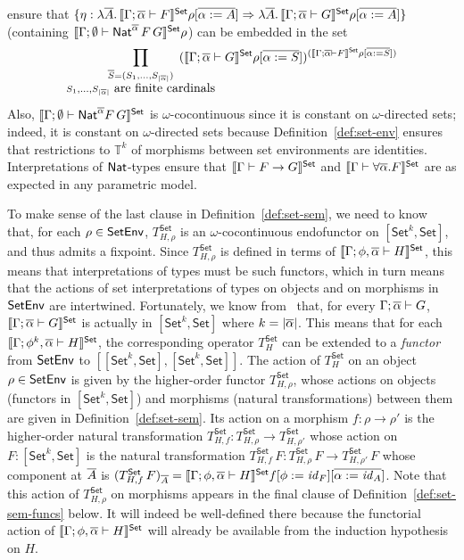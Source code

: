 \documentclass{lmcs}
\theoremstyle{plain}\newtheorem{satz}[thm]{Satz}
\newcommand{\set}{\mathsf{Set}}
\renewcommand{\id}{\mathit{id}}
\begin{document}
{ensure that $\{\eta : \lambda \ol{A}.\,\setsem{\Gamma;\ol{\alpha}
  \vdash F}\rho[\ol{\alpha := A}] \Rightarrow \lambda
\ol{A}.\,\setsem{\Gamma;\ol{\alpha} \vdash G}\rho[\ol{\alpha := A}]\}$
(containing $\setsem{\Gamma;\emptyset \vdash
  \Nat^{\ol{\alpha}}\,F\,G}\rho$) can be embedded in the set
\[ \prod_{\substack{\ol{S} =
    (S_1,...,S_{|\ol{\alpha}|})\\ S_1,...,S_{|\ol{\alpha}|} \mbox{ are
      finite cardinals}}} \hspace*{-0.4in}(\setsem{\Gamma;\ol{\alpha}
  \vdash G}\rho[\ol{\alpha := S}])^{(\setsem{\Gamma;\ol{\alpha} \vdash
    F}\rho[\ol{\alpha := S}])}\] Also, $\setsem{\Gamma; \emptyset
  \vdash \Nat^{\ol\alpha} F\,G}$ is $\omega$-cocontinuous since it is
constant on $\omega$-directed sets; indeed, it is constant on
$\omega$-directed sets because Definition~\ref{def:set-env} ensures
that restrictions to $\mathbb{T}^k$ of morphisms between set
environments are identities.  Interpretations of $\mathsf{Nat}$-types ensure
that $\setsem{\Gamma \vdash F \to G}$ and $\setsem{\Gamma \vdash
  \forall \ol\alpha. F}$ are as expected in any parametric model.

To make sense of the last clause in Definition~\ref{def:set-sem}, we
need to know that, for each $\rho \in \mathsf{SetEnv}$, $T^\set_{H,\rho}$ is
an $\omega$-cocontinuous endofunctor on $[\set^k, \set]$, and thus
admits a fixpoint.  Since $T_{H,\rho}^\set$ is defined in terms of
$\setsem{\Gamma;\phi, \ol{\alpha} \vdash H}$, this means that
interpretations of types must be such functors, which in turn means
that the actions of set interpretations of types on objects and on
morphisms in $\mathsf{SetEnv}$ are intertwined. Fortunately, we know
from~\cite{jp19} that, for every $\Gamma; \overline{\alpha} \vdash G$,
$\setsem{\Gamma; \ol{\alpha} \vdash G}$ is actually in $[\set^k,\set]$
where $k = |\overline{\alpha}|$. This means that for each $\setsem{\Gamma;
  \phi^k, \ol{\alpha} \vdash H}$, the corresponding operator
$T^\set_{H}$ can be extended to a {\em functor} from $\mathsf{SetEnv}$ to
$[[\set^k,\set],[\set^k,\set]]$. The action of $T^\set_H$ on an object
$\rho \in \mathsf{SetEnv}$ is given by the higher-order functor
$T_{H,\rho}^\set$, whose actions on objects (functors in $[\set^k,
  \set]$) and morphisms (natural transformations) between them are
given in Definition~\ref{def:set-sem}. Its action on a morphism $f :
\rho \to \rho'$ is the higher-order natural transformation
$T^\set_{H,f} : T^\set_{H,\rho} \to T^\set_{H,\rho'}$ whose action on
$F : [\set^k,\set]$ is the natural transformation $T^\set_{H,f}\, F :
T^\set_{H,\rho}\,F \to T^\set_{H,\rho'}\,F$ whose component at
$\overline{A}$ is $(T^\set_{H,f}\, F)_{\ol{A}} = \setsem{\Gamma;
  \phi,\ol{\alpha} \vdash H}f[\phi := \id_F][\ol{\alpha := \id_A}]$.
Note that this action of $T_{H,\rho}^\set$ on morphisms appears in the
final clause of Definition~\ref{def:set-sem-funcs} below. It will
indeed be well-defined there because the functorial action of
$\setsem{\Gamma; \phi,\ol{\alpha} \vdash H}$ will already be available
from the induction hypothesis on $H$.

}
\end{document}
